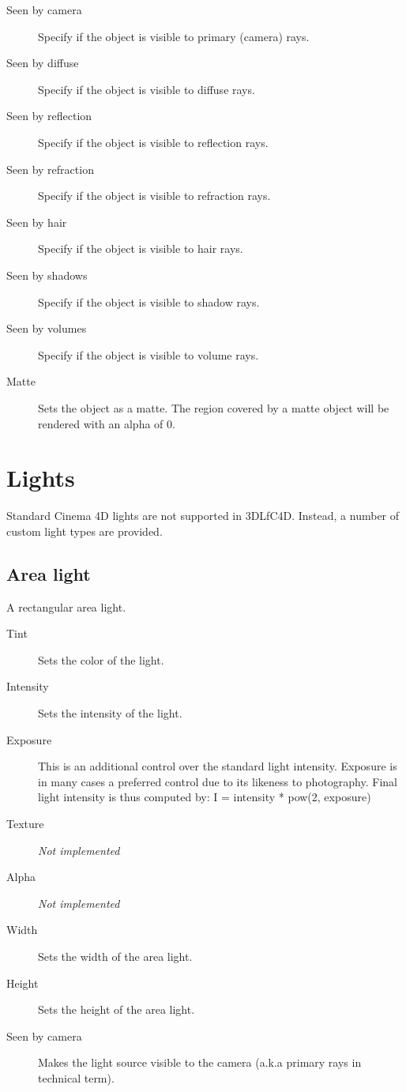 \documentclass{book}
\begin{document}
\begin{description}
\item[Seen by camera] Specify if the object is visible to primary (camera) rays.
\item[Seen by diffuse] Specify if the object is visible to diffuse rays.
\item [Seen by reflection] Specify if the object is visible to reflection rays.  
\item [Seen by refraction] Specify if the object is visible to refraction rays.  
\item [Seen by hair] Specify if the object is visible to hair rays.
\item[Seen by shadows] Specify if the object is visible to shadow rays.
\item[Seen by volumes] Specify if the object is visible to volume rays. 
\item[Matte] Sets the object as a matte. The region covered by a matte object will be rendered with an alpha of 0.
\end{description}

\section{Lights}
Standard Cinema 4D lights are not supported in 3DLfC4D. Instead, a number of custom light types are provided.

\subsection{Area light}
A rectangular area light. 

\begin{description}
\item[Tint] Sets the color of the light.
\item[Intensity] Sets the intensity of the light. 
\item[Exposure] This is an additional control over the standard light intensity. Exposure is in many cases a preferred control due to its likeness to photography. Final light intensity is thus computed by: I = intensity * pow(2, exposure)
\item[Texture] \emph{Not implemented}
\item[Alpha] \emph{Not implemented}
\item[Width] Sets the width of the area light.
\item[Height] Sets the height of the area light.
\item[Seen by camera] Makes the light source visible to the camera (a.k.a primary rays in technical term).
\end{description}
\end{document}
